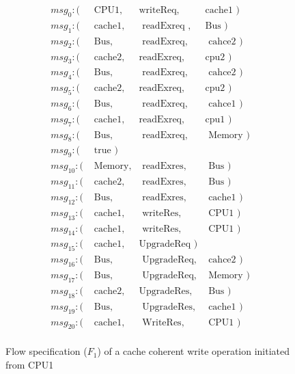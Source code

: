 \documentclass[conference]{IEEEtran}
\begin{document}
\begin{figure}
{\footnotesize
\[
\begin{array}{llll}
msg_0: (&\mbox{ CPU1},&\mbox{writeReq},&\mbox{cache1   })\\       
msg_1: (&\mbox{ cache1},&\mbox{ readExreq },&\mbox{Bus     })\\        
msg_2: (&\mbox{ Bus},&\mbox{ readExreq},&\mbox{ cahce2 })\\  
msg_3: (&\mbox{ cache2},&\mbox{readExreq},&\mbox{cpu2         })\\   
msg_4: (&\mbox{ Bus},&\mbox{ readExreq},&\mbox{ cahce2           })\\  
msg_5: (&\mbox{ cache2},&\mbox{readExreq},&\mbox{cpu2 })\\  
msg_6: (&\mbox{ Bus},&\mbox{ readExreq},&\mbox{ cahce1       })\\     
msg_7: (&\mbox{ cache1},&\mbox{readExreq},&\mbox{cpu1           })\\  
msg_8: (&\mbox{ Bus},&\mbox{ readExreq},&\mbox{ Memory })\\  
msg_9: (&\mbox{ true                                          })\\  
msg_{10}: (&\mbox{ Memory},&\mbox{ readExres},&\mbox{ Bus        })\\  
msg_{11}: (&\mbox{ cache2},&\mbox{ readExres},&\mbox{ Bus })\\  
msg_{12}: (&\mbox{ Bus},&\mbox{ readExres},&\mbox{ cache1        })\\  
msg_{13}: (&\mbox{ cache1},&\mbox{ writeRes},&\mbox{ CPU1         })\\  
msg_{14}: (&\mbox{ cache1},&\mbox{ writeRes},&\mbox{ CPU1 })\\  
msg_{15}: (&\mbox{ cache1},&\mbox{UpgradeReq             })\\  
msg_{16}: (&\mbox{ Bus},&\mbox{ UpgradeReq},&\mbox{ cahce2      })\\   
msg_{17}: (&\mbox{ Bus},&\mbox{ UpgradeReq},&\mbox{ Memory })\\  
msg_{18}: (&\mbox{ cache2},&\mbox{UpgradeRes},&\mbox{ Bus     })\\  
msg_{19}: (&\mbox{ Bus},&\mbox{ UpgradeRes},&\mbox{ cache1      })\\  
msg_{20}: (&\mbox{ cache1},&\mbox{ WriteRes},&\mbox{ CPU1 })\\  
\end{array}
\]}
\caption{Flow specification ($F_1$) of a cache coherent write operation initiated from CPU1}
\label{write-flow}
\end{figure}
\end{document}
